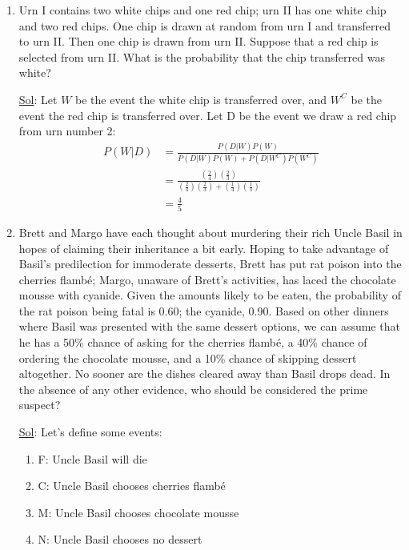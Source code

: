 \begin{enumerate}
  \item[40.] Urn I contains two white chips and one red chip; urn II
    has one white chip and two red chips. One chip is drawn at random
    from urn I and transferred to urn II. Then one chip is drawn from
    urn II. Suppose that a red chip is selected from urn II. What is
    the probability that the chip transferred was white?

    \underline{Sol}:
    Let \(W\) be the event the white chip is transferred over, and
    \(W^C\) be the event the red chip is transferred over. Let D be
    the event we draw a red chip from urn number 2:
    \[
      \begin{aligned}
        P(W|D) &= \frac{P(D|W) P(W)}{P(D|W) P(W) + P(D|W^C) P(W^C)} \\
        &= \frac{(\frac{2}{4}) (\frac{2}{3})}{(\frac{2}{4})
        (\frac{2}{3}) + (\frac{1}{4}) (\frac{1}{3})} \\
        &= \boxed{\frac{4}{5}}
      \end{aligned}
    \]

  \item[46.] Brett and Margo have each thought about murdering their
    rich Uncle Basil in hopes of claiming their inheritance a bit
    early. Hoping to take advantage of Basil’s predilection for
    immoderate desserts, Brett has put rat poison into the cherries
    flamb\'{e}; Margo, unaware of Brett’s activities, has laced the
    chocolate mousse with cyanide. Given the amounts likely to be
    eaten, the probability of the rat poison being fatal is 0.60; the
    cyanide, 0.90. Based on other dinners where Basil was presented
    with the same dessert options, we can assume that he has a 50\%
    chance of asking for the cherries flamb\'{e}, a 40\% chance of
    ordering the chocolate mousse, and a 10\% chance of skipping
    dessert altogether. No sooner are the dishes cleared away than
    Basil drops dead. In the absence of any other evidence, who
    should be considered the prime suspect?

    \underline{Sol}:
    Let's define some events:
    \begin{enumerate}
      \item F: Uncle Basil will die
      \item C: Uncle Basil chooses cherries flamb\'{e}
      \item M: Uncle Basil chooses chocolate mousse
      \item N: Uncle Basil chooses no dessert
    \end{enumerate}


\end{enumerate}
